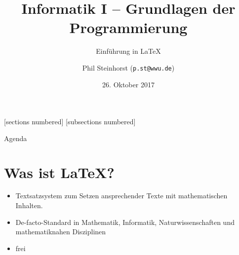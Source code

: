 \documentclass[10pt,wide,xcolor={x11names},hyperref={colorlinks=false},pantone312,mygreen,handout]{beamer}
\author{Phil Steinhorst (\texttt{p.st@wwu.de})}
\title{Informatik I -- Grundlagen der Programmierung}
\subtitle{Einführung in LaTeX}
\date{26. Oktober 2017}
\begin{document}
[sections numbered]
[subsections numbered]

\begin{frame}[plain]
  \maketitle
\end{frame}

\begin{frame}[t]{Agenda}
\tableofcontents[]
\end{frame}

\AtBeginSection[]
{
	\begin{frame}[t]
		\tableofcontents[currentsection, sectionstyle=show/shaded]
	\end{frame}
}
\AtBeginSubsection[]
{
	\begin{frame}[t]
	\tableofcontents[currentsubsection,sectionstyle=show/shaded,subsectionstyle=show/shaded]
\end{frame}
}

\section{Was ist LaTeX?}
\begin{frame}[t]{\secname}
	\begin{itemize}[<+->]
		\item Textsatzsystem zum Setzen ansprechender Texte mit mathematischen Inhalten.
		\minoritem {}
		\item De-facto-Standard in Mathematik, Informatik, Naturwissenschaften und mathematiknahen Disziplinen \cite{CTAN}
		\item frei \cite{LPPL}
	\end{itemize}
\end{frame}
\end{document}
